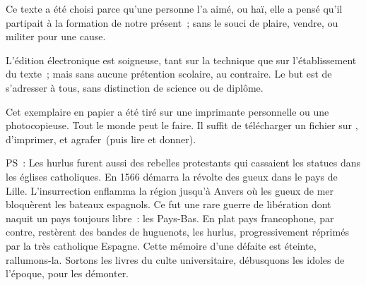 \documentclass[french,twoside]{book} %
\begin{document}
  Ce texte a été choisi parce qu’une personne l’a aimé,
  ou haï, elle a pensé qu’il partipait à la formation de notre présent ;
  sans le souci de plaire, vendre, ou militer pour une cause.
  \par

  L’édition électronique est soigneuse, tant sur la technique
  que sur l’établissement du texte ; mais sans aucune prétention scolaire, au contraire.
  Le but est de s’adresser à tous, sans distinction de science ou de diplôme.
  \par

  Cet exemplaire en papier a été tiré sur une imprimante personnelle
   ou une photocopieuse. Tout le monde peut le faire.
  Il suffit de
  télécharger un fichier sur \href{https://hurlus.fr}{},
  d’imprimer, et agrafer (puis lire et donner).\par

  \bigskip

  \noindent PS : Les hurlus furent aussi des rebelles protestants qui cassaient les statues dans les églises catholiques. En 1566 démarra la révolte des gueux dans le pays de Lille. L’insurrection enflamma la région jusqu’à Anvers où les gueux de mer bloquèrent les bateaux espagnols.
  Ce fut une rare guerre de libération dont naquit un pays toujours libre : les Pays-Bas.
  En plat pays francophone, par contre, restèrent des bandes de huguenots, les hurlus, progressivement réprimés par la très catholique Espagne.
  Cette mémoire d’une défaite est éteinte, rallumons-la. Sortons les livres du culte universitaire, débusquons les idoles de l’époque, pour les démonter.
\fi
\end{document}
